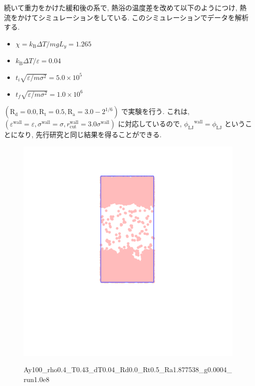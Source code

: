 続いて重力をかけた緩和後の系で, 熱浴の温度差を改めて以下のようにつけ, 熱流をかけてシミュレーションをしている. このシミュレーションでデータを解析する.

\begin{itemize}
  \item $\chi = k_{\text{B}}\Delta T / mg L_y = 1.265$
  \item $k_{\text{B}} \Delta T/\varepsilon = 0.04$
  \item $t_i \sqrt{\varepsilon / m \sigma^2} = 5.0 \times 10^{5}$
  \item $t_f \sqrt{\varepsilon / m \sigma^2} = 1.0 \times 10^{6}$
\end{itemize}

$(\text{R}_\text{d} = 0.0, \text{R}_\text{t} = 0.5, \text{R}_\text{a} = 3.0 - 2^{1/6})$ で実験を行う. これは, $(\varepsilon^{\text{wall}} = \varepsilon, \sigma^{\text{wall}} = \sigma, r^{\text{wall}}_{\text{cut}} = 3.0 \sigma^{\text{wall}})$ に対応しているので, ${\phi_{\text{LJ}}}^{\text{wall}} = \phi_{\text{LJ}}$ ということになり, 先行研究と同じ結果を得ることができる.

\begin{figure}[H]
  \centering
  \href{https://youtu.be/CIEyUPvPY6A}{\includegraphics[scale=0.2]{image/2023-11-21T21:01:17.543_followup_chi1.265_Ay100_rho0.4_T0.43_dT0.04_Rd0.0_Rt0.5_Ra1.877538_g0.00019998593898298055_run1.0e8_output.png}}
  \caption{Ay100\_rho0.4\_T0.43\_dT0.04\_Rd0.0\_Rt0.5\_Ra1.877538\_g0.0004\_run1.0e8}
  \label{}
\end{figure}

